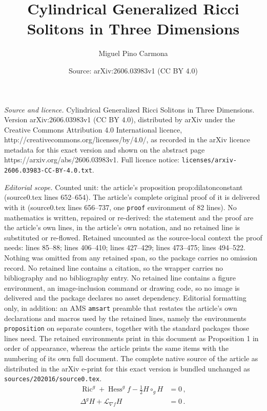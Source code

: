 \documentclass[10pt,a4paper]{amsart}
\title{Cylindrical Generalized Ricci Solitons in Three Dimensions}
\author{Miguel Pino Carmona}
\date{Source: arXiv:2606.03983v1 (CC BY 4.0)}
\DeclareMathOperator{\Hess}{\mathrm{Hess}}
\DeclareMathOperator{\Ric}{\mathrm{Ric}}
\newcommand{\cL}{\mathcal{L}}
\begin{document}
\maketitle

\noindent\emph{Source and licence.} Cylindrical Generalized Ricci Solitons in Three Dimensions. Version arXiv:2606.03983v1 (CC BY 4.0), distributed by arXiv under the Creative Commons Attribution 4.0 International licence, http://creativecommons.org/licenses/by/4.0/, as recorded in the arXiv licence metadata for this exact version and shown on the abstract page https://arxiv.org/abs/2606.03983v1. Full licence notice: \texttt{licenses/arxiv-2606.03983-CC-BY-4.0.txt}.\par\smallskip

\noindent\textit{Editorial scope.} Counted unit: the article's proposition prop:dilatonconstant (source0.tex lines 652--654). The article's complete original proof of it is delivered with it (source0.tex lines 656--737, one \texttt{proof} environment of 82 lines). No mathematics is written, repaired or re-derived: the statement and the proof are the article's own lines, in the article's own notation, and no retained line is substituted or re-flowed.  Retained uncounted as the source-local context the proof needs: lines 85--88; lines 406--410; lines 427--429; lines 473--475; lines 494--522.  Nothing was omitted from any retained span, so the package carries no omission record.  No retained line contains a citation, so the wrapper carries no bibliography and no bibliography entry.  No retained line contains a figure environment, an image-inclusion command or drawing code, so no image is delivered and the package declares no asset dependency.  Editorial formatting only, in addition: an AMS \texttt{amsart} preamble that restates the article's own declarations and macros used by the retained lines, namely the environments \texttt{proposition} on separate counters, together with the standard packages those lines need.  The retained environments print in this document as Proposition 1 in order of appearance, whereas the article prints the same items with the numbering of its own full document.  The complete native source of the article as distributed in the arXiv e-print for this exact version is bundled unchanged as \texttt{sources/202016/source0.tex}.
\begin{align}
\Ric^g + \Hess^g f - \frac{1}{2}H \circ_g H &= 0 \,, \label{eq:einsteinGSS} \\
\Delta^g H + \cL_{\nabla f} H &= 0 \,. \label{eq:maxwellGSS}
\end{align}
\end{document}
